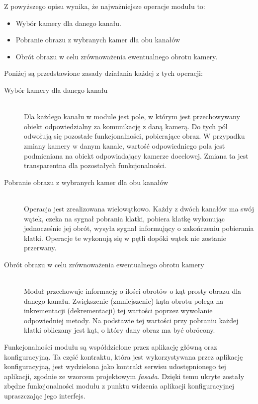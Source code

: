 \documentclass[a4paper,11pt,twoside]{report}
\theoremstyle{definition}
\begin{document}
Z powyższego opisu wynika, że najważniejsze operacje modułu to:
\begin{itemize}
\item Wybór kamery dla danego kanału.
\item Pobranie obrazu z wybranych kamer dla obu kanałów
\item Obrót obrazu w celu zrównoważenia ewentualnego obrotu kamery.
\end{itemize}

Poniżej są przedstawione zasady działania każdej z tych operacji:
\begin{description}
\item [Wybór kamery dla danego kanału] \hfill \\
Dla każdego kanału w module jest pole, w którym jest przechowywany obiekt odpowiedzialny za komunikację z daną kamerą. Do tych pól odwołują się pozostałe funkcjonalności, pobierające obraz. W przypadku zmiany kamery w danym kanale, wartość odpowiedniego pola jest podmieniana na obiekt odpowiadający kamerze docelowej. Zmiana ta jest transparentna dla pozostałych funkcjonalności.
\item [Pobranie obrazu z wybranych kamer dla obu kanałów] \hfill \\
Operacja jest zrealizowana wielowątkowo. Każdy z dwóch kanałów ma swój wątek, czeka na sygnał pobrania klatki, pobiera klatkę wykonując jednocześnie jej obrót, wysyła sygnał informujący o zakończeniu pobierania klatki. Operacje te wykonują się w pętli dopóki wątek nie zostanie przerwany.

\pagebreak
\item [Obrót obrazu w celu zrównoważenia ewentualnego obrotu kamery] \hfill \\
Moduł przechowuje informację o ilości obrotów o kąt prosty obrazu dla danego kanału. Zwiększenie (zmniejszenie) kąta obrotu polega na inkrementacji (dekrementacji) tej wartości poprzez wywołanie odpowiedniej metody. Na podstawie tej wartości przy pobraniu każdej klatki obliczany jest kąt, o który dany obraz ma być obrócony.
\end{description}

Funkcjonalności modułu są współdzielone przez aplikację główną oraz konfiguracyjną. Ta część kontraktu, która jest wykorzystywana przez aplikację konfiguracyjną, jest wydzielona jako kontrakt serwisu udostępnionego tej aplikacji, zgodnie ze wzorcem projektowym \textit{fasada}. Dzięki temu ukryte zostały zbędne funkcjonalności modułu z punktu widzenia aplikacji konfiguracyjnej upraszczając jego interfejs.
\end{document}
